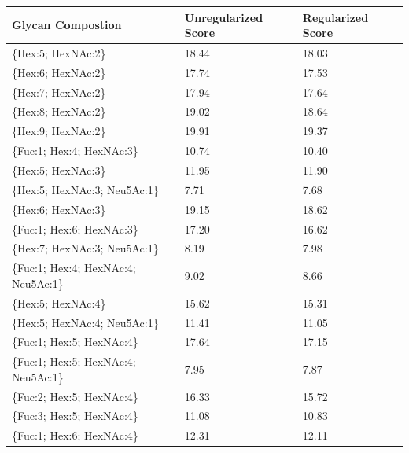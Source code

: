 \begin{table}
\begin{minipage}[t]{0.55\linewidth}
    \begin{footnotesize}
    \begin{tabular}{l|p{2cm} p{2cm}}
Glycan Compostion &  Unregularized Score &  Regularized Score \\
\hline
\{Hex:5; HexNAc:2\}                  &                18.44 &              18.03 \\
\{Hex:6; HexNAc:2\}                  &                17.74 &              17.53 \\
\{Hex:7; HexNAc:2\}                  &                17.94 &              17.64 \\
\{Hex:8; HexNAc:2\}                  &                19.02 &              18.64 \\
\{Hex:9; HexNAc:2\}                  &                19.91 &              19.37 \\
\{Fuc:1; Hex:4; HexNAc:3\}           &                10.74 &              10.40 \\
\{Hex:5; HexNAc:3\}                  &                11.95 &              11.90 \\
\{Hex:5; HexNAc:3; Neu5Ac:1\}        &                 7.71 &               7.68 \\
\{Hex:6; HexNAc:3\}                  &                19.15 &              18.62 \\
\{Fuc:1; Hex:6; HexNAc:3\}           &                17.20 &              16.62 \\
\{Hex:7; HexNAc:3; Neu5Ac:1\}        &                 8.19 &               7.98 \\
\{Fuc:1; Hex:4; HexNAc:4; Neu5Ac:1\} &                 9.02 &               8.66 \\
\{Hex:5; HexNAc:4\}                  &                15.62 &              15.31 \\
\{Hex:5; HexNAc:4; Neu5Ac:1\}        &                11.41 &              11.05 \\
\{Fuc:1; Hex:5; HexNAc:4\}           &                17.64 &              17.15 \\
\{Fuc:1; Hex:5; HexNAc:4; Neu5Ac:1\} &                 7.95 &               7.87 \\
\{Fuc:2; Hex:5; HexNAc:4\}           &                16.33 &              15.72 \\
\{Fuc:3; Hex:5; HexNAc:4\}           &                11.08 &              10.83 \\
\{Fuc:1; Hex:6; HexNAc:4\}           &                12.31 &              12.11 \\

\end{tabular}
\end{footnotesize}
\end{minipage}
\end{table}
